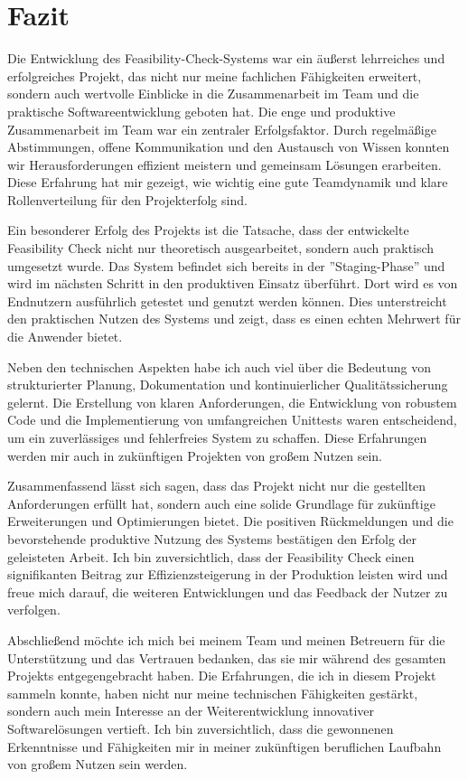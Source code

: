 \chapter{Fazit}

Die Entwicklung des Feasibility-Check-Systems war ein äußerst lehrreiches und erfolgreiches Projekt, das nicht nur meine fachlichen Fähigkeiten erweitert, sondern auch wertvolle Einblicke in die Zusammenarbeit im Team und die praktische Softwareentwicklung geboten hat. Die enge und produktive Zusammenarbeit im Team war ein zentraler Erfolgsfaktor. Durch regelmäßige Abstimmungen, offene Kommunikation und den Austausch von Wissen konnten wir Herausforderungen effizient meistern und gemeinsam Lösungen erarbeiten. Diese Erfahrung hat mir gezeigt, wie wichtig eine gute Teamdynamik und klare Rollenverteilung für den Projekterfolg sind.

Ein besonderer Erfolg des Projekts ist die Tatsache, dass der entwickelte Feasibility Check nicht nur theoretisch ausgearbeitet, sondern auch praktisch umgesetzt wurde. Das System befindet sich bereits in der ''Staging-Phase'' und wird im nächsten Schritt in den produktiven Einsatz überführt. Dort wird es von Endnutzern ausführlich getestet und genutzt werden können. Dies unterstreicht den praktischen Nutzen des Systems und zeigt, dass es einen echten Mehrwert für die Anwender bietet.

Neben den technischen Aspekten habe ich auch viel über die Bedeutung von strukturierter Planung, Dokumentation und kontinuierlicher Qualitätssicherung gelernt. Die Erstellung von klaren Anforderungen, die Entwicklung von robustem Code und die Implementierung von umfangreichen Unittests waren entscheidend, um ein zuverlässiges und fehlerfreies System zu schaffen. Diese Erfahrungen werden mir auch in zukünftigen Projekten von großem Nutzen sein.

Zusammenfassend lässt sich sagen, dass das Projekt nicht nur die gestellten Anforderungen erfüllt hat, sondern auch eine solide Grundlage für zukünftige Erweiterungen und Optimierungen bietet. Die positiven Rückmeldungen und die bevorstehende produktive Nutzung des Systems bestätigen den Erfolg der geleisteten Arbeit. Ich bin zuversichtlich, dass der Feasibility Check einen signifikanten Beitrag zur Effizienzsteigerung in der Produktion leisten wird und freue mich darauf, die weiteren Entwicklungen und das Feedback der Nutzer zu verfolgen.

Abschließend möchte ich mich bei meinem Team und meinen Betreuern für die Unterstützung und das Vertrauen bedanken, das sie mir während des gesamten Projekts entgegengebracht haben. Die Erfahrungen, die ich in diesem Projekt sammeln konnte, haben nicht nur meine technischen Fähigkeiten gestärkt, sondern auch mein Interesse an der Weiterentwicklung innovativer Softwarelösungen vertieft. Ich bin zuversichtlich, dass die gewonnenen Erkenntnisse und Fähigkeiten mir in meiner zukünftigen beruflichen Laufbahn von großem Nutzen sein werden.




